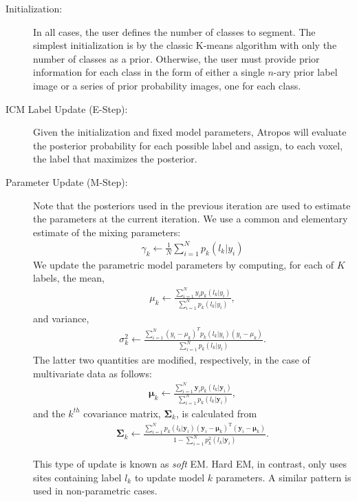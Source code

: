 \documentclass[11pt,english]{article}
\begin{document}
\begin{description}
\item[Initialization:] In all cases, the user defines the number of
classes to segment.  The simplest initialization is by the classic
K-means algorithm with only the number of classes as a prior.
Otherwise, the user must provide prior information for each class in
the form of either a single $n$-ary prior label image or a series of
prior probability images, one for each class.
\item[ICM Label Update (E-Step):] Given the initialization and fixed
model parameters, Atropos will evaluate the posterior probability for
each possible label and assign, to each voxel, the label that
maximizes the posterior. 
\item[Parameter Update (M-Step):] 
Note that the posteriors used in the previous iteration are used to 
estimate the parameters at the current iteration.  
We use a common and elementary estimate of the mixing parameters:
\begin{align}
\gamma_k \leftarrow \frac{1}{N} \sum_{i=1}^N  p_k(l_k|y_i)
\end{align}
We update the parametric model parameters by computing, for each of
  $K$ labels, the mean,
\begin{align}  
 \mu_k \leftarrow \frac{ \sum_{i=1}^N  y_i p_k(l_k|y_i)}{ \sum_{i=1}^N p_k(l_k|y_i) },
\end{align}
and variance,
\begin{align}  
 \sigma^2_k \leftarrow  \frac{ \sum_{i=1}^N  (y_i - \mu_k )^T
   p_k(l_k|y_i) (y_i - \mu_k )}{ \sum_{i=1}^N p_k(l_k|y_i) }.
\end{align}
The latter two quantities are modified, respectively, in the case of multivariate data as follows:
\begin{align}
 \boldsymbol{\mu}_k \leftarrow \frac{ \sum_{i=1}^N  \mathbf{y}_i p_k(l_k|\mathbf{y}_i)}{ \sum_{i=1}^N p_k(l_k|\mathbf{y}_i) },
\end{align}
and the $k^{th}$ covariance matrix, $\boldsymbol{\Sigma}_k$, is calculated from
\begin{align}
 \boldsymbol{\Sigma}_{k} \leftarrow \frac{ \sum_{i=1}^N  p_k(l_k|\mathbf{y}_i) ( \mathbf{y}_{i} - \boldsymbol{\mu}_{k} )^{\mathrm{T}}  ( \mathbf{y}_{i} - \boldsymbol{\mu}_{k} )}{1 - \sum_{i=1}^N p^2_k(l_k|\mathbf{y}_{i}) }.
\end{align}

This type of update is known as {\em soft} EM.  Hard EM, in
contrast, only uses sites containing label $l_k$ to update model $k$ parameters.
A similar pattern is used in non-parametric cases.
\end{description}
\end{document}
